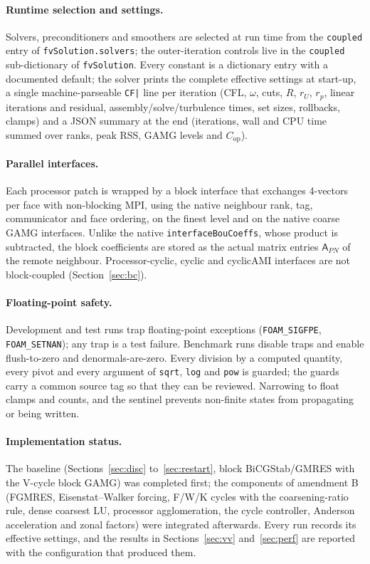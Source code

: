 \documentclass[11pt,a4paper]{article}
\newcommand{\code}[1]{\texttt{#1}}
\begin{document}
\paragraph{Runtime selection and settings.} Solvers, preconditioners and
smoothers are selected at run time from the \code{coupled} entry of
\code{fvSolution.solvers}; the outer-iteration controls live in the
\code{coupled} sub-dictionary of \code{fvSolution}. Every constant is a
dictionary entry with a documented default; the solver prints the complete
effective settings at start-up, a single machine-parseable \code{CF|} line
per iteration (CFL, $\omega$, cuts, $R$, $r_U$, $r_p$, linear iterations and
residual, assembly/solve/turbulence times, set sizes, rollbacks, clamps) and
a JSON summary at the end (iterations, wall and CPU time summed over ranks,
peak RSS, GAMG levels and $C_{\mathrm{op}}$).

\paragraph{Parallel interfaces.} Each processor patch is wrapped by a block
interface that exchanges 4-vectors per face with non-blocking MPI, using the
native neighbour rank, tag, communicator and face ordering, on the finest
level and on the native coarse GAMG interfaces. Unlike the native
\code{interfaceBouCoeffs}, whose product is subtracted, the block
coefficients are stored as the actual matrix entries $\mathsf A_{PN}$ of the
remote neighbour. Processor-cyclic, cyclic and cyclicAMI interfaces are not
block-coupled (Section~\ref{sec:bc}).

\paragraph{Floating-point safety.} Development and test runs trap
floating-point exceptions (\code{FOAM\_SIGFPE}, \code{FOAM\_SETNAN}); any trap is
a test failure. Benchmark runs disable traps and enable flush-to-zero and
denormals-are-zero. Every division by a computed quantity, every pivot and
every argument of \code{sqrt}, \code{log} and \code{pow} is guarded; the
guards carry a common source tag so that they can be reviewed. Narrowing to
float clamps and counts, and the sentinel prevents non-finite states from
propagating or being written.

\paragraph{Implementation status.} The baseline (Sections~\ref{sec:disc}
to~\ref{sec:restart}, block BiCGStab/GMRES with the V-cycle block GAMG) was
completed first; the components of amendment B (FGMRES, Eisenstat--Walker
forcing, F/W/K cycles with the coarsening-ratio rule, dense coarsest LU,
processor agglomeration, the cycle controller, Anderson acceleration and
zonal factors) were integrated afterwards. Every run records its effective
settings, and the results in Sections~\ref{sec:vv} and~\ref{sec:perf} are
reported with the configuration that produced them.
\end{document}
